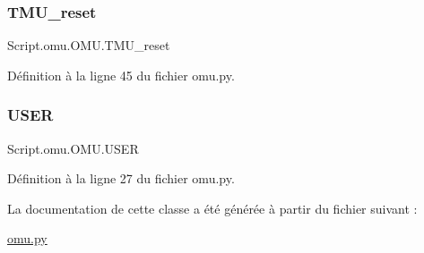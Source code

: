 \subsubsection{\texorpdfstring{T\+M\+U\+\_\+reset}{TMU\_reset}}
{\footnotesize\ttfamily Script.\+omu.\+O\+M\+U.\+T\+M\+U\+\_\+reset}



Définition à la ligne 45 du fichier omu.\+py.

\mbox{\label{classScript_1_1omu_1_1OMU_a2b281abf15a86f56b9d55b66513010be}} 
\subsubsection{\texorpdfstring{U\+S\+ER}{USER}}
{\footnotesize\ttfamily Script.\+omu.\+O\+M\+U.\+U\+S\+ER}



Définition à la ligne 27 du fichier omu.\+py.



La documentation de cette classe a été générée à partir du fichier suivant \+:\begin{DoxyCompactItemize}
\item 
\hyperlink{omu_8py}{omu.\+py}\end{DoxyCompactItemize}
